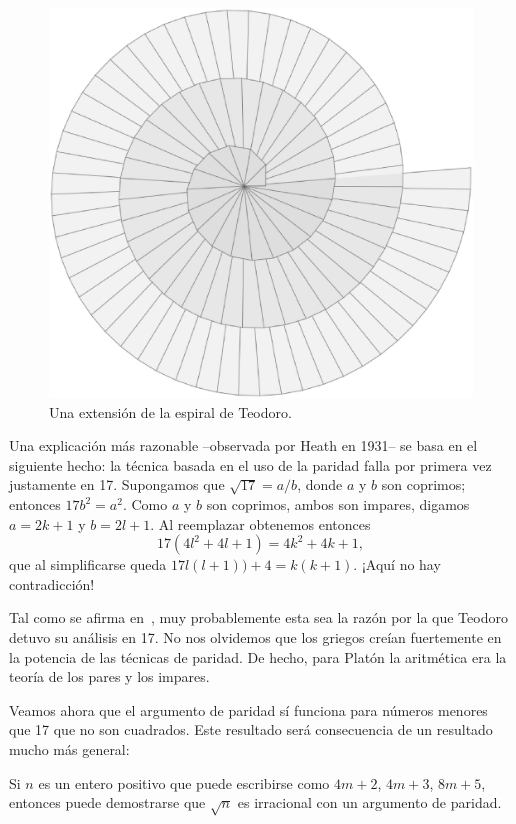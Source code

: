 \begin{figure}[h]
		\centering
		\includegraphics[scale=0.2]{images/infinita}
		\caption{Una extensión de la espiral de Teodoro.}
		\label{fig:espiral_infinita}
\end{figure}

Una explicación más razonable --observada
por Heath en 1931-- se basa en el siguiente hecho: la técnica basada en el uso
de la paridad falla por primera vez justamente en 17.  Supongamos que
$\sqrt{17}=a/b$, donde $a$ y $b$ son coprimos; entonces $17b^2=a^2$. Como $a$ y
$b$ son coprimos, ambos son impares, digamos $a=2k+1$ y $b=2l+1$. Al reemplazar
obtenemos entonces
\[
	17(4l^2+4l+1)=4k^2+4k+1,
\]
que al simplificarse queda $17l(l+1))+4=k(k+1)$. ¡Aquí no hay contradicción!

Tal como se afirma en~\cite{MR0416824}, muy probablemente esta sea la razón por
la que Teodoro detuvo su análisis en 17. No nos olvidemos que los griegos
creían fuertemente en la potencia de las técnicas de paridad. De hecho, para
Platón la aritmética era la teoría de los pares y los impares. 

Veamos ahora que el argumento de paridad sí funciona para números menores que
17 que no son cuadrados. Este resultado será consecuencia de un resultado mucho
más general:

\begin{theorem}
	Si $n$ es un entero positivo que puede escribirse como $4m+2$, $4m+3$,
	$8m+5$, entonces puede demostrarse que $\sqrt{n}$ es irracional con un
	argumento de paridad.
\end{theorem}

